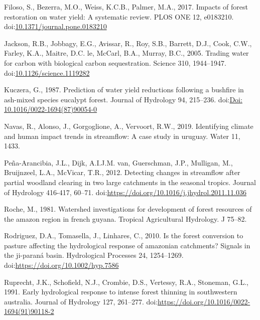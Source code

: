 \documentclass[]{elsarticle} %
\newlength{\cslhangindent}
\newlength{\cslentryspacingunit} %
\newenvironment{CSLReferences}[2] %
 {%
  \setlength{\parindent}{0pt}
  \ifodd #1
  \let\oldpar\par
  \def\par{\hangindent=\cslhangindent\oldpar}
  \fi
  \setlength{\parskip}{#2\cslentryspacingunit}
 }%
 {}
\begin{document}
\begin{CSLReferences}{1}{0}
\leavevmode{}%
Filoso, S., Bezerra, M.O., Weiss, K.C.B., Palmer, M.A., 2017. Impacts of forest restoration on water yield: A systematic review. PLOS ONE 12, e0183210. doi:\href{https://doi.org/10.1371/journal.pone.0183210}{10.1371/journal.pone.0183210}

\leavevmode{}%
Jackson, R.B., Jobbagy, E.G., Avissar, R., Roy, S.B., Barrett, D.J., Cook, C.W., Farley, K.A., Maitre, D.C. le, McCarl, B.A., Murray, B.C., 2005. Trading water for carbon with biological carbon sequestration. Science 310, 1944--1947. doi:\href{https://doi.org/10.1126/science.1119282}{10.1126/science.1119282}

\leavevmode{}%
Kuczera, G., 1987. Prediction of water yield reductions following a bushfire in ash-mixed species eucalypt forest. Journal of Hydrology 94, 215--236. doi:\href{https://doi.org/Doi:\%2010.1016/0022-1694(87)90054-0}{Doi: 10.1016/0022-1694(87)90054-0}

\leavevmode{}%
Navas, R., Alonso, J., Gorgoglione, A., Vervoort, R.W., 2019. Identifying climate and human impact trends in streamflow: A case study in uruguay. Water 11, 1433.

\leavevmode{}%
Peña-Arancibia, J.L., Dijk, A.I.J.M. van, Guerschman, J.P., Mulligan, M., Bruijnzeel, L.A., McVicar, T.R., 2012. Detecting changes in streamflow after partial woodland clearing in two large catchments in the seasonal tropics. Journal of Hydrology 416-417, 60--71. doi:\url{https://doi.org/10.1016/j.jhydrol.2011.11.036}

\leavevmode{}%
Roche, M., 1981. Watershed investigations for development of forest resources of the amazon region in french guyana. Tropical Agricultural Hydrology. J 75--82.

\leavevmode{}%
Rodriguez, D.A., Tomasella, J., Linhares, C., 2010. Is the forest conversion to pasture affecting the hydrological response of amazonian catchments? Signals in the ji-paraná basin. Hydrological Processes 24, 1254--1269. doi:\url{https://doi.org/10.1002/hyp.7586}

\leavevmode{}%
Ruprecht, J.K., Schofield, N.J., Crombie, D.S., Vertessy, R.A., Stoneman, G.L., 1991. Early hydrological response to intense forest thinning in southwestern australia. Journal of Hydrology 127, 261--277. doi:\url{https://doi.org/10.1016/0022-1694(91)90118-2}


\end{CSLReferences}
\end{document}
